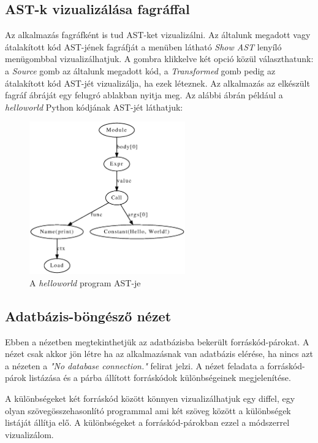 \pagebreak

\subsection{AST-k vizualizálása fagráffal}

Az alkalmazás fagráfként is tud AST-ket vizualizálni.
Az általunk megadott vagy átalakított kód AST-jének fagráfját a menüben látható
\emph{Show AST} lenyíló menügombbal vizualizálhatjuk.
A gombra klikkelve két opció közül választhatunk:
a \emph{Source} gomb az általunk megadott kód, a \emph{Transformed} gomb pedig az átalakított kód
AST-jét vizualizálja, ha ezek léteznek.
Az alkalmazás az elkészült fagráf ábráját egy felugró ablakban nyitja meg.
Az alábbi ábrán például a \emph{helloworld} Python kódjának AST-jét láthatjuk:

\begin{figure}[H]
	\centering
	\includegraphics[width=0.6\textwidth]{images/figs/ast_graph.eps}
	\caption{A \emph{helloworld} program AST-je}
\end{figure}

\subsection{Adatbázis-böngésző nézet}

Ebben a nézetben megtekinthetjük az adatbázisba bekerült forráskód-párokat.
A nézet csak akkor jön létre ha az alkalmazásnak van adatbázis elérése,
ha nincs azt a nézeten a \emph{"No database connection."} felirat jelzi.
A nézet feladata a forráskód-párok listázása és a párba állított forráskódok
különbségeinek megjelenítése.

A különbségeket két forráskód között könnyen vizualizálhatjuk egy diffel,
egy olyan szövegösszehasonlító programmal ami két szöveg között a különbségek
listáját állítja elő.
A különbségeket a forráskód-párokban ezzel a módszerrel vizualizálom.

